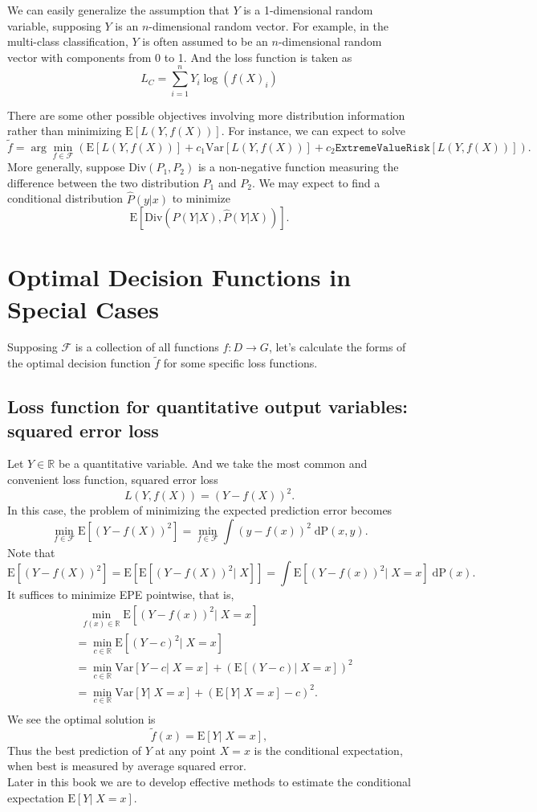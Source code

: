\documentclass{report}
\theoremstyle{nonumberplain}
\newcommand{\0}{\mathbf{0}}
\begin{document}
We can easily generalize the assumption that $Y$ is a 1-dimensional random variable, supposing $Y$ is an $n$-dimensional random vector. For example, in the multi-class classification, $Y$ is often assumed to be an $n$-dimensional random vector with components from 0 to 1. And the loss function is taken as
\[
L_C=\sum_{i=1}^{n}Y_i\log (f(X)_i)
\]
 
There are some other possible objectives involving more distribution information rather than minimizing $\mathrm{E}[L(Y,f(X))]$. For instance, we can expect to solve
\[
\tilde{f}=\arg\min_{f\in\mathcal{F}}\left(\mathrm{E}[L(Y,f(X))]+c_1\mathrm{Var}[L(Y,f(X))]+c_2 \mathtt{Extreme Value Risk}[L(Y,f(X))]\right).
\]
More generally, suppose $\mathrm{Div}(P_1,P_2)$ is a non-negative function measuring the difference between the two distribution $P_1$ and $P_2$. We may expect to find a conditional distribution $\hat{P}(y|x)$ to minimize $$\mathrm{E}[\mathrm{Div}(P(Y|X),\hat{P}(Y|X))].$$


		
	
\section{Optimal Decision Functions in Special Cases}
Supposing $\mathcal{F}$ is a collection of all functions $f:D\to G$, let's calculate the forms of the optimal decision function $\tilde{f}$ for some specific loss functions.
\subsection{Loss function for quantitative output variables: squared error loss}
Let $Y\in\mathbb{R}$ be a quantitative variable. And we take the most
common and convenient loss function, squared error loss
\[
L(Y,f(X))=(Y-f(X))^2.
\]
In this case, the problem of minimizing the expected prediction error becomes
\[
\min_{f\in\mathcal{F}}\mathrm{E}[(Y-f(X))^2]=\min_{f\in\mathcal{F}}\int (y-f(x))^2\;\mathrm{dP}(x,y).
\]
Note that
\[\mathrm{E}[(Y-f(X))^2]=\mathrm{E}[\mathrm{E}[(Y-f(X))^2|\; X]]=\int\mathrm{E}[(Y-f(x))^2|\; X=x]\;\mathrm{dP}(x).\]
It suffices to minimize EPE pointwise, that is, 
\begin{align*}
&\ \ \min_{f(x)\in\mathbb{R}}\mathrm{E}[(Y-f(x))^2|\; X=x]\\
&=\min_{c\in\mathbb{R}}\mathrm{E}[(Y-c)^2|\; X=x]\\
&=\min_{c\in\mathbb{R}}\mathrm{Var}[Y-c|\; X=x]+(\mathrm{E}[(Y-c)|\; X=x])^2\\
&=\min_{c\in\mathbb{R}}\mathrm{Var}[Y|\; X=x]+(\mathrm{E}[Y|\; X=x]-c)^2.\\
\end{align*}
We see the optimal solution is
\[
\tilde{f}(x) = \mathrm{E}[Y|\; X=x],
\]
Thus the best prediction of $Y$ at any point $X = x$ is the conditional expectation, when best is measured by average squared error. \\
Later in this book we are to develop effective methods to estimate the conditional expectation $\mathrm{E}[Y|\; X=x]$.
\end{document}
